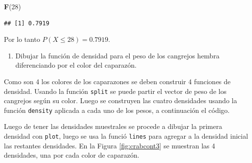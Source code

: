 \documentclass[10pt,]{krantz}
\makeatletter
\newenvironment{Shaded}{\begin{snugshade}}{\end{snugshade}}
\newcommand{\KeywordTok}[1]{\textcolor[rgb]{0.13,0.29,0.53}{\textbf{{#1}}}}
\newcommand{\DataTypeTok}[1]{\textcolor[rgb]{0.13,0.29,0.53}{{#1}}}
\newcommand{\DecValTok}[1]{\textcolor[rgb]{0.00,0.00,0.81}{{#1}}}
\newcommand{\StringTok}[1]{\textcolor[rgb]{0.31,0.60,0.02}{{#1}}}
\newcommand{\NormalTok}[1]{{#1}}
\providecommand{\tightlist}{%
  \setlength{\itemsep}{0pt}\setlength{\parskip}{0pt}}
\newenvironment{kframe}{%
\medskip{}
\setlength{\fboxsep}{.8em}
 \def\at@end@of@kframe{}%
 \ifinner\ifhmode%
  \def\at@end@of@kframe{\end{minipage}}%
  \begin{minipage}{\columnwidth}%
 \fi\fi%
 \def\FrameCommand##1{\hskip\@totalleftmargin \hskip-\fboxsep
 \colorbox{shadecolor}{##1}\hskip-\fboxsep
     \hskip-\linewidth \hskip-\@totalleftmargin \hskip\columnwidth}%
 \MakeFramed {\advance\hsize-\width
   \@totalleftmargin\z@ \linewidth\hsize
   \@setminipage}}%
 {\par\unskip\endMakeFramed%
 \at@end@of@kframe}
\renewenvironment{Shaded}{\begin{kframe}}{\end{kframe}}
\makeatother
\begin{document}
\begin{Shaded}
\begin{Highlighting}[]
\KeywordTok{F}\NormalTok{(}\DecValTok{28}\NormalTok{)}
\end{Highlighting}
\end{Shaded}

\begin{verbatim}
## [1] 0.7919
\end{verbatim}

Por lo tanto \(P(X \leq 28)=0.7919\).

\begin{enumerate}
\def\labelenumi{\arabic{enumi})}
\setcounter{enumi}{3}
\tightlist
\item
  Dibujar la función de densidad para el peso de los cangrejos hembra
  diferenciando por el color del caparazón.
\end{enumerate}

Como son 4 los colores de los caparazones se deben construir 4 funciones
de densidad. Usando la función \texttt{split} se puede partir el vector
de peso de los cangrejos según su color. Luego se construyen las cuatro
densidades usando la función \texttt{density} aplicada a cada uno de los
pesos, a continuación el código.

\begin{Shaded}
\end{Shaded}

Luego de tener las densidades muestrales se procede a dibujar la primera
densidad con \texttt{plot}, luego se usa la funció \texttt{lines} para
agregar a la densidad inicial las restantes densidades. En la Figura
\ref{fig:crabcont3} se muestran las 4 densidades, una por cada color de
caparazón.
\end{document}

